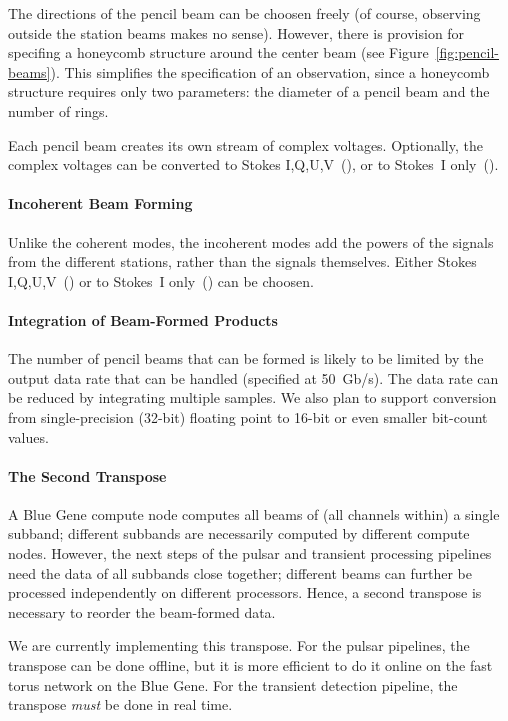 The directions of the pencil beam can be choosen freely (of course, observing
outside the station beams makes no sense).
However, there is provision for specifing a honeycomb structure around the
center beam (see Figure~\ref{fig:pencil-beams}).
This simplifies the specification of an observation, since a honeycomb structure
requires only two parameters: the diameter of a pencil beam and the number
of rings.

Each pencil beam creates its own stream of complex voltages.
Optionally, the complex voltages can be converted to Stokes
I,Q,U,V~(), or to Stokes~I only~().


\paragraph{Incoherent Beam Forming}
Unlike the coherent modes, the incoherent modes add the powers of the signals
from the different stations, rather than the signals themselves.
Either Stokes I,Q,U,V~() or to Stokes~I
only~() can be choosen.


\paragraph{Integration of Beam-Formed Products }
The number of pencil beams that can be formed is likely to be limited by the
output data rate that can be handled (specified at 50~Gb/s).
The data rate can be reduced by integrating multiple samples.
We also plan to support conversion from single-precision (32-bit) floating
point to 16-bit or even smaller bit-count values.


\paragraph{The Second Transpose }
A Blue Gene compute node computes all beams of (all channels within) a
single subband; different subbands are necessarily computed by different 
compute nodes.
However, the next steps of the pulsar and transient processing pipelines
need the data of all subbands close together; different beams can further be
processed independently on different processors.
Hence, a second transpose is necessary to reorder the beam-formed data.

We are currently implementing this transpose.
For the pulsar pipelines, the transpose can be done offline, but it is more
efficient to do it online on the fast torus network on the Blue Gene.
For the transient detection pipeline, the transpose \emph{must\/} be done
in real time.


